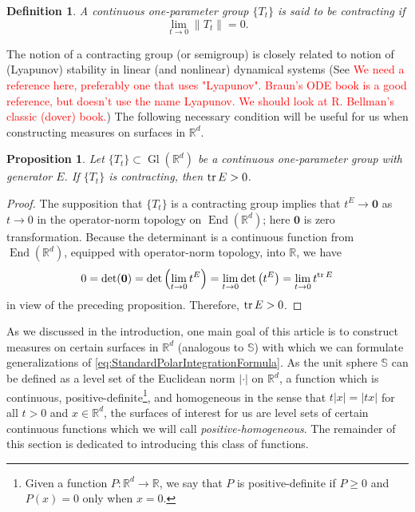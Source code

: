 \documentclass[11pt]{article}
\newtheorem{definition}[theorem]{Definition}
\newtheorem{proposition}[theorem]{Proposition}
\newcommand\End{\operatorname{End}} %
\newcommand\Gl{\operatorname{Gl}}                     %
\renewcommand\det{\operatorname{det}}
\begin{document}
\begin{definition} A continuous one-parameter group $\{T_t\}$ is said to be \textit{contracting} if
\begin{equation*}
\lim_{t\to 0}\|T_t\|=0. 
\end{equation*}
\end{definition}

\noindent The notion of a contracting group (or semigroup) is closely related to notion of (Lyapunov) stability in linear (and nonlinear) dynamical systems (See \textcolor{red}{We need a reference here, preferably one that uses "Lyapunov". Braun's ODE book is a good reference, but doesn't use the name Lyapunov. We should look at R. Bellman's classic (dover) book.}) The following necessary condition will be useful for us when constructing measures on surfaces in $\mathbb{R}^d$.

\begin{proposition}\label{prop:ContractingTrace}
Let $\{T_t\}\subset\Gl(\mathbb{R}^d)$ be a continuous one-parameter group with generator $E$. If $\{T_t\}$ is  contracting, then $\tr E>0$. 
\end{proposition}
\begin{proof}
The supposition that $\{T_t\}$ is a contracting group implies that $t^E\to \mathbf{0}$ as $t\to 0$ in the operator-norm topology on $\End(\mathbb{R}^d)$; here $\mathbf{0}$ is zero transformation. Because the determinant is a continuous function from $\End(\mathbb{R}^d)$, equipped with operator-norm topology, into $\mathbb{R}$, we have
\begin{equation*}
0=\det(\mathbf{0})=\det\left(\lim_{t\to 0}t^E\right)=\lim_{t\to 0}\det\left(t^E\right)=\lim_{t\to 0}t^{\tr E}
\end{equation*}
in view of the preceding proposition. Therefore, $\tr E>0$.
\end{proof}

\noindent As we discussed in the introduction, one main goal of this article is to construct measures on certain surfaces in $\mathbb{R}^d$ (analogous to $\mathbb{S}$) with which we can formulate generalizations of \eqref{eq:StandardPolarIntegrationFormula}. As the unit sphere $\mathbb{S}$ can be defined as a level set of the Euclidean norm $|\cdot|$ on $\mathbb{R}^d$, a function which is continuous,  positive-definite\footnote{Given a function $P:\mathbb{R}^d\to\mathbb{R}$, we say that $P$ is positive-definite if $P\geq 0$ and $P(x)=0$ only when $x=0$.}, and homogeneous in the sense that $t|x|=|tx|$ for all $t>0$ and $x\in\mathbb{R}^d$, the surfaces of interest for us are level sets of certain continuous functions which we will call \textit{positive-homogeneous}. The remainder of this section is dedicated to introducing this class of functions.\\
\end{document}
